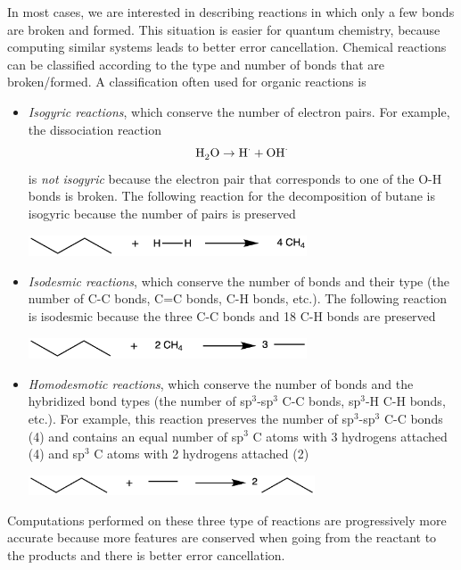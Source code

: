 \documentclass[../Main/notes.tex]{subfiles}
\begin{document}
In most cases, we are interested in describing reactions in which only a few bonds are broken and formed.
This situation is easier for quantum chemistry, because computing similar systems leads to better error cancellation.
Chemical reactions can be classified according to the type and number of bonds that are broken/formed.
A classification often used for organic reactions is
\begin{itemize}
\item \emph{Isogyric reactions}, which conserve the number of electron pairs.
For example, the dissociation reaction
\begin{equation}
\ce{H2O} \rightarrow \ce{H}^\cdot + \ce{OH}^\cdot
\end{equation}
is \emph{not isogyric} because the electron pair that corresponds to one of the O-H bonds is broken.
The following reaction for the decomposition of butane is isogyric because the number of pairs is preserved

\begin{center}
\includegraphics[width=3.25in]{img/isogyric.png}
\end{center}

\item \emph{Isodesmic reactions}, which conserve the number of bonds and their type (the number of C-C bonds, C=C bonds, C-H bonds, etc.).
The following reaction is isodesmic because the three C-C bonds and 18 C-H bonds are preserved

\begin{center}
\includegraphics[width=3.25in]{img/isodesmic.png}
\end{center}

\item \emph{Homodesmotic reactions}, which conserve the number of bonds and the hybridized bond types (the number of sp$^3$-sp$^3$ C-C bonds, sp$^3$-H C-H bonds, etc.).
For example, this reaction preserves the number of sp$^3$-sp$^3$ C-C bonds (4) and contains an equal number of sp$^3$ C atoms with 3 hydrogens attached (4) and sp$^3$ C atoms with 2 hydrogens attached (2)

\begin{center}
\includegraphics[width=3.35in]{img/homodesmotic.png}
\end{center}

\end{itemize}
Computations performed on these three type of reactions are progressively more accurate because more features are conserved when going from the reactant to the products and there is better error cancellation.
\end{document}

